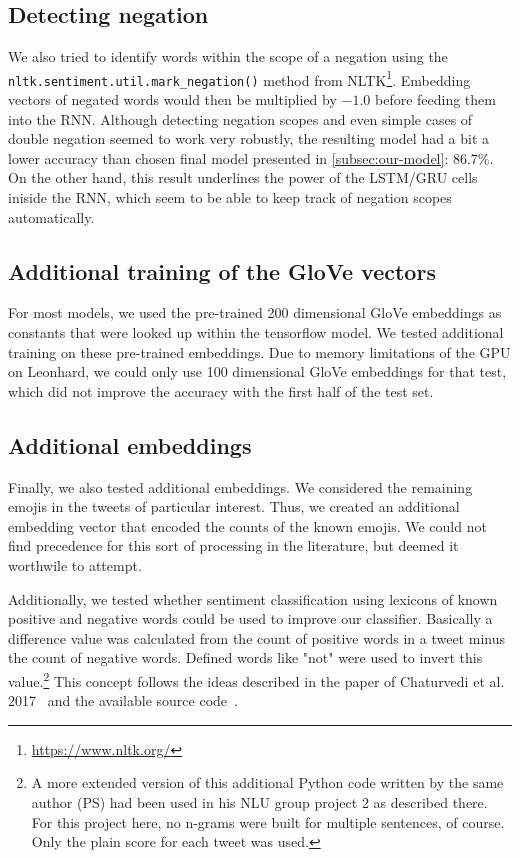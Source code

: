\documentclass[10pt,conference,compsocconf]{IEEEtran}
\begin{document}
\subsection*{Detecting negation}

We also tried to identify words within the scope of a negation using
the \texttt{nltk.sentiment.util.mark\_negation()} method from
NLTK\footnote{\url{https://www.nltk.org/}}.
Embedding vectors of negated words would then be multiplied by $-1.0$ before
feeding them into the RNN. Although detecting negation scopes and even
simple cases of double negation seemed to work very robustly, the
resulting model had a bit a lower accuracy than chosen final model presented in
\autoref{subsec:our-model}: 86.7\%. On the other hand, this result underlines
the power of the LSTM/GRU cells iniside the RNN, which seem to be able
to keep track of negation scopes automatically.


\subsection*{Additional training of the GloVe vectors}

For most models, we used the pre-trained 200 dimensional GloVe embeddings as
constants that were looked up within the tensorflow model. We tested additional
training on these pre-trained embeddings. Due to memory limitations of the GPU on
Leonhard, we could only use 100 dimensional GloVe embeddings for that test, which
did not improve the accuracy with the first half of the test set.


\subsection*{Additional embeddings}

Finally, we also tested additional embeddings.  We considered the
remaining emojis in the tweets of particular interest. Thus, we
created an additional embedding vector that encoded the counts of the
known emojis. We could not find precedence for this sort of processing
in the literature, but deemed it worthwile to attempt.

Additionally, we tested whether sentiment classification using lexicons of known 
positive and negative words could be used to improve our classifier.
Basically a difference value was calculated from the count of positive words in a 
tweet minus the count of negative words. Defined words like "not" were used to 
invert this value.\footnote{A more extended version of this additional Python code 
written by the same author (PS) had been used in his NLU group project 2 as 
described there. For this project here, no n-grams were built for multiple 
sentences, of course. Only the plain score for each tweet was used.} This concept 
follows the ideas described in the paper of Chaturvedi et al. 
2017~\cite{chaturvedi2017} and the available source code~\cite{chaturvedi_code}.
\end{document}
